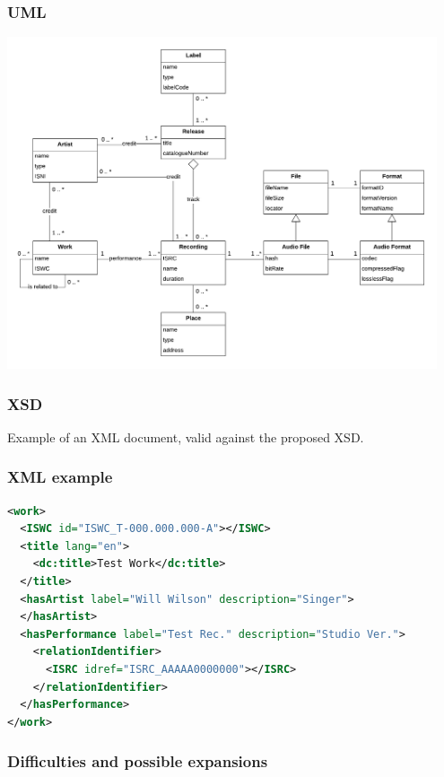\documentclass{beamer}
\begin{document}
  \begin{frame}
    \frametitle{UML}
    \begin{center}
      \includegraphics[width=0.95\textwidth]{img/UML.pdf}
    \end{center}
  \end{frame}



  \begin{frame}
    \frametitle{XSD}
  \end{frame}



  \begin{frame}[fragile]

    Example of an XML document, valid against the proposed XSD.

    \vspace{1em}

    \frametitle{XML example}
\lstset{basicstyle=\scriptsize}
\begin{lstlisting}[language=XML]
<work>
  <ISWC id="ISWC_T-000.000.000-A"></ISWC>
  <title lang="en">
    <dc:title>Test Work</dc:title>
  </title>
  <hasArtist label="Will Wilson" description="Singer">
  </hasArtist>
  <hasPerformance label="Test Rec." description="Studio Ver.">
    <relationIdentifier>
      <ISRC idref="ISRC_AAAAA0000000"></ISRC>
    </relationIdentifier>
  </hasPerformance>
</work>
\end{lstlisting}
  \end{frame}



  \begin{frame}
    \frametitle{Difficulties and possible expansions}
  \end{frame}
\end{document}
